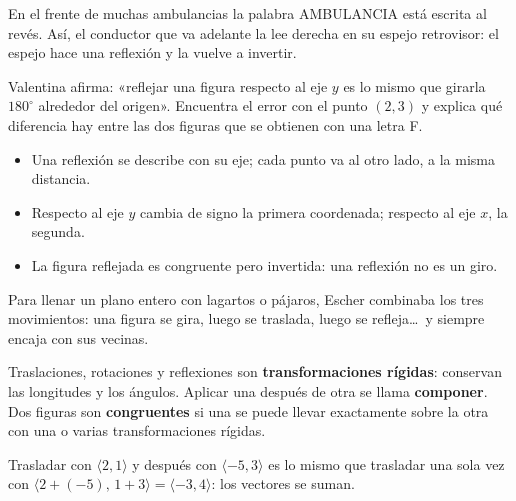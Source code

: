 \documentclass[11pt]{article}
\begin{document}
\begin{aplicacion}
En el frente de muchas ambulancias la palabra AMBULANCIA está escrita al revés. Así, el
conductor que va adelante la lee derecha en su espejo retrovisor: el espejo hace una reflexión y
la vuelve a invertir.
\end{aplicacion}

\begin{preguntas}
\pregunta Valentina afirma: «reflejar una figura respecto al eje $y$ es lo mismo que girarla
$180^\circ$ alrededor del origen». Encuentra el error con el punto $(2, 3)$ y explica qué
diferencia hay entre las dos figuras que se obtienen con una letra F.
\end{preguntas}

\begin{resumen}
\begin{itemize}
  \item Una reflexión se describe con su eje; cada punto va al otro lado, a la misma distancia.
  \item Respecto al eje $y$ cambia de signo la primera coordenada; respecto al eje $x$, la segunda.
  \item La figura reflejada es congruente pero invertida: una reflexión no es un giro.
\end{itemize}
\end{resumen}

\label{tema:transformaciones}

\begin{hilo}
Para llenar un plano entero con lagartos o pájaros, Escher combinaba los tres movimientos: una
figura se gira, luego se traslada, luego se refleja\ldots\ y siempre encaja con sus vecinas.
\end{hilo}

\begin{definicion}
Traslaciones, rotaciones y reflexiones son \textbf{transformaciones rígidas}: conservan las
longitudes y los ángulos. Aplicar una después de otra se llama \textbf{componer}. Dos figuras son
\textbf{congruentes} si una se puede llevar exactamente sobre la otra con una o varias
transformaciones rígidas.
\end{definicion}

\begin{ejemplo}
Trasladar con $\langle 2, 1\rangle$ y después con $\langle -5, 3\rangle$ es lo mismo que trasladar
una sola vez con $\langle 2 + (-5),\, 1 + 3\rangle = \langle -3, 4\rangle$: los vectores se suman.
\end{ejemplo}
\end{document}

